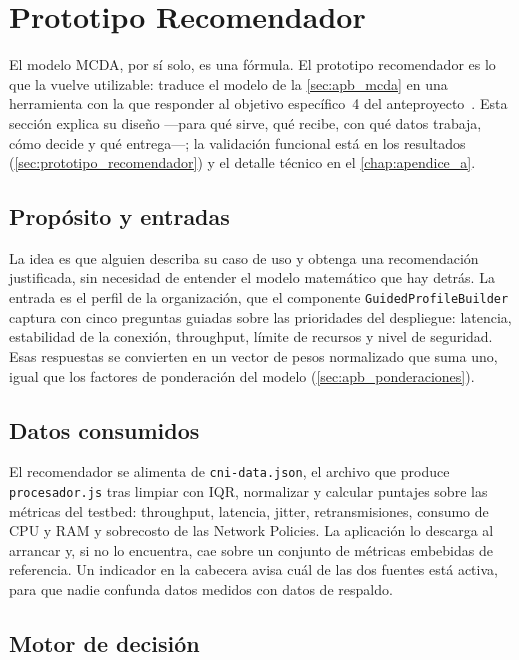 \section{Prototipo Recomendador}

El modelo MCDA, por sí solo, es una fórmula. El prototipo recomendador es lo que la vuelve utilizable: traduce el modelo de la \cref{sec:apb_mcda} en una herramienta con la que responder al objetivo específico~4 del anteproyecto~\cite{ref29}. Esta sección explica su diseño ---para qué sirve, qué recibe, con qué datos trabaja, cómo decide y qué entrega---; la validación funcional está en los resultados (\cref{sec:prototipo_recomendador}) y el detalle técnico en el \cref{chap:apendice_a}.

\subsection{Propósito y entradas}

La idea es que alguien describa su caso de uso y obtenga una recomendación justificada, sin necesidad de entender el modelo matemático que hay detrás. La entrada es el perfil de la organización, que el componente \texttt{GuidedProfileBuilder} captura con cinco preguntas guiadas sobre las prioridades del despliegue: latencia, estabilidad de la conexión, throughput, límite de recursos y nivel de seguridad. Esas respuestas se convierten en un vector de pesos normalizado que suma uno, igual que los factores de ponderación del modelo (\cref{sec:apb_ponderaciones}).

\subsection{Datos consumidos}

El recomendador se alimenta de \texttt{cni-data.json}, el archivo que produce \texttt{procesador.js} tras limpiar con IQR, normalizar y calcular puntajes sobre las métricas del testbed: throughput, latencia, jitter, retransmisiones, consumo de CPU y RAM y sobrecosto de las Network Policies. La aplicación lo descarga al arrancar y, si no lo encuentra, cae sobre un conjunto de métricas embebidas de referencia. Un indicador en la cabecera avisa cuál de las dos fuentes está activa, para que nadie confunda datos medidos con datos de respaldo.

\subsection{Motor de decisión}

